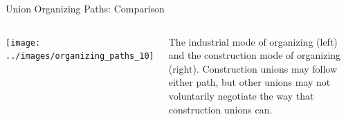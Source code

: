 \documentclass{beamer}
\begin{document}
\begin{frame}{Union Organizing Paths: Comparison}
  \begin{columns}
    \texttt{[image: ../images/organizing\_paths\_10]}

    The industrial mode of organizing (left) and the construction mode of organizing (right).\newline\newline
    Construction unions may follow either path, but other unions may not voluntarily negotiate the way that construction unions can.
    \end{columns}
\end{frame}

%

\end{document}
